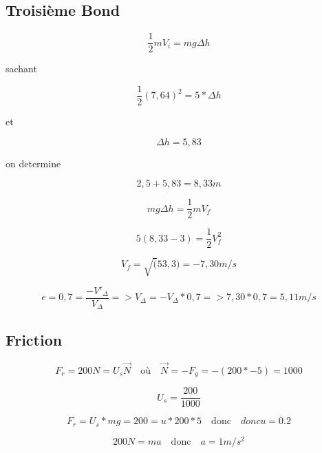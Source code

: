 \documentclass{article}
\begin{document}
\subsection{Troisième Bond}
\begin{equation}
\frac{1}{2}mV_{i} = mg \Delta h
\end{equation}
\begin{center}
sachant
\end{center}  

\begin{equation}
\frac{1}{2} (7,64)^2 = 5*\Delta h
\end{equation}
\begin{center}
et
\end{center}

\begin{equation}
\Delta h = 5,83
\end{equation}


\begin{center}
on determine
\end{center}


\begin{equation}
2,5 + 5,83 = 8,33m
\end{equation}

\begin{equation}
mg \Delta h = \frac{1}{2}mV_{f}
\end{equation}

\begin{equation}
5(8,33-3) = \frac{1}{2} V_{f}^2
\end{equation}

\begin{equation}
V_{f}=  \sqrt(53,3) = -7,30 m/s
\end{equation}

\begin{equation}
e = 0,7 = \frac{-V'_{\Delta}}{V_{\Delta}} => V_{\Delta} = -V_{\Delta}*0,7 => 7,30*0,7 = 5,11 m/s
\end{equation}
\subsection{Friction}

\begin{equation}
F_{r} = 200N = U_{s} \vec{N} \quad \textrm{où} \quad\vec{N} = -F_{g} = -(200*-5) = 1000
\end{equation}
 
 \begin{equation}
 U_{s} = \frac{200}{1000}
 \end{equation}
 
 \begin{equation}
 F_{r} = U_{s} * mg = 200 = u * 200* 5 \quad \textrm{donc} \quad donc u = 0.2
 \end{equation}
 
 \begin{equation}
 200N = ma  \quad \textrm{donc} \quad a = 1m/s^2
 \end{equation}
\end{document}
